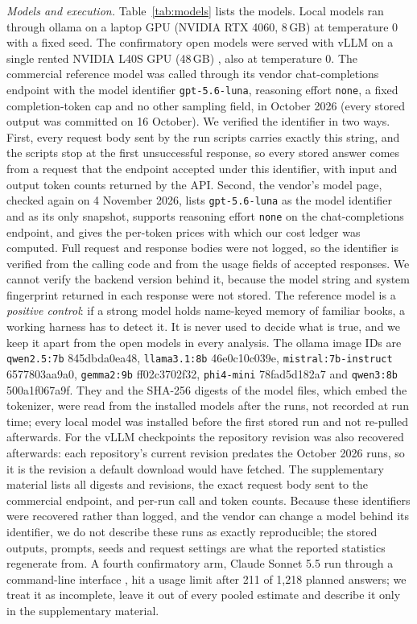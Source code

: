 \documentclass[sn-mathphys]{sn-jnl}%
\theoremstyle{thmstyleone}%
\theoremstyle{thmstyletwo}%
\theoremstyle{thmstylethree}%
\begin{document}
\emph{Models and execution.} Table~\ref{tab:models} lists the models. Local models ran through ollama \cite{ollama} on a laptop GPU (NVIDIA RTX 4060, 8\,GB) at temperature 0 with a fixed seed. The confirmatory open models were served with vLLM \cite{kwon2023vllm} on a single rented NVIDIA L40S GPU (48\,GB) \cite{runpod2026pricing}, also at temperature 0. The commercial reference model was called through its vendor chat-completions endpoint \cite{openai2026models} with the model identifier \texttt{gpt-5.6-luna}, reasoning effort \texttt{none}, a fixed completion-token cap and no other sampling field, in October 2026 (every stored output was committed on 16 October). We verified the identifier in two ways. First, every request body sent by the run scripts carries exactly this string, and the scripts stop at the first unsuccessful response, so every stored answer comes from a request that the endpoint accepted under this identifier, with input and output token counts returned by the API. Second, the vendor's model page, checked again on 4 November 2026, lists \texttt{gpt-5.6-luna} as the model identifier and as its only snapshot, supports reasoning effort \texttt{none} on the chat-completions endpoint, and gives the per-token prices with which our cost ledger was computed. Full request and response bodies were not logged, so the identifier is verified from the calling code and from the usage fields of accepted responses. We cannot verify the backend version behind it, because the model string and system fingerprint returned in each response were not stored. The reference model is a \emph{positive control}: if a strong model holds name-keyed memory of familiar books, a working harness has to detect it. It is never used to decide what is true, and we keep it apart from the open models in every analysis. The ollama image IDs are \texttt{qwen2.5:7b} 845dbda0ea48, \texttt{llama3.1:8b} 46e0c10c039e, \texttt{mistral:7b-instruct} 6577803aa9a0, \texttt{gemma2:9b} ff02c3702f32, \texttt{phi4-mini} 78fad5d182a7 and \texttt{qwen3:8b} 500a1f067a9f. They and the SHA-256 digests of the model files, which embed the tokenizer, were read from the installed models after the runs, not recorded at run time; every local model was installed before the first stored run and not re-pulled afterwards. For the vLLM checkpoints the repository revision was also recovered afterwards: each repository's current revision predates the October 2026 runs, so it is the revision a default download would have fetched. The supplementary material lists all digests and revisions, the exact request body sent to the commercial endpoint, and per-run call and token counts. Because these identifiers were recovered rather than logged, and the vendor can change a model behind its identifier, we do not describe these runs as exactly reproducible; the stored outputs, prompts, seeds and request settings are what the reported statistics regenerate from. A fourth confirmatory arm, Claude Sonnet 5.5 run through a command-line interface \cite{anthropic2026claudecode}, hit a usage limit after 211 of 1,218 planned answers; we treat it as incomplete, leave it out of every pooled estimate and describe it only in the supplementary material.
\end{document}
